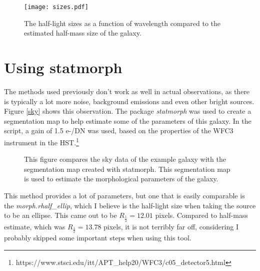 \documentclass[10pt, preprint]{aastex}
\begin{document}
\begin{figure}[h!]
    \centering
    \texttt{[image: sizes.pdf]}
    \caption{The half-light sizes as a function of wavelength compared to the estimated half-mass size of the galaxy.}
    \label{sizes}
\end{figure}

\section{Using statmorph}

The methods used previously don't work as well in actual observations, as there is typically a lot more noise, background emissions and even other bright sources. Figure \ref{sky} shows this observation. The package \textit{statmorph} was used to create a segmentation map to help estimate some of the parameters of this galaxy. In the script, a gain of 1.5 e-/DN was used, based on the properties of the WFC3 instrument in the HST.\footnote{https://www.stsci.edu/itt/APT\_help20/WFC3/c05\_detector5.html}

\begin{figure}[H]
  \centering
  \hfill
  \caption{This figure compares the sky data of the example galaxy with the segmentation map created with statmorph. This segmentation map is used to estimate the morphological parameters of the galaxy.}
\end{figure}

This method provides a lot of parameters, but one that is easily comparable is the \textit{morph.rhalf\_ellip}, which I believe is the half-light size when taking the source to be an ellipse. This came out to be $R_{\frac{1}{2}} = 12.01$ pixels. Compared to half-mass estimate, which was $R_{\frac{1}{2}} = 13.78$ pixels, it is not terribly far off, considering I probably skipped some important steps when using this tool. 
\end{document}
